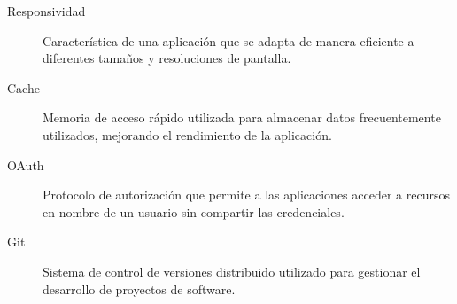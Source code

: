 \begin{description}
    \item[\hypertarget{responsividad}{Responsividad}] Característica de una aplicación que se adapta de manera eficiente a diferentes tamaños y resoluciones de pantalla.
    \item[\hypertarget{cache}{Cache}] Memoria de acceso rápido utilizada para almacenar datos frecuentemente utilizados, mejorando el rendimiento de la aplicación.
    \item[\hypertarget{oauth}{OAuth}] Protocolo de autorización que permite a las aplicaciones acceder a recursos en nombre de un usuario sin compartir las credenciales.
    \item[\hypertarget{git}{Git}] Sistema de control de versiones distribuido utilizado para gestionar el desarrollo de proyectos de software.
\end{description}

\endinput